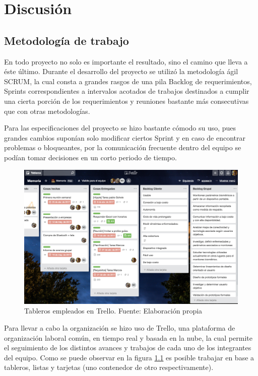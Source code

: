 \chapter{Discusión}\label{discusion}

\section{Metodología de trabajo}

En todo proyecto no solo es importante el resultado, sino el camino que lleva a éste último. Durante el desarrollo del proyecto se utilizó la metodología ágil SCRUM, la cual consta a grandes rasgos de una pila Backlog de requerimientos, Sprints correspondientes a intervalos acotados de trabajos destinados a cumplir una cierta porción de los requerimientos y reuniones bastante más consecutivas que con otras metodologías. 

Para las especificaciones del proyecto se hizo bastante cómodo su uso, pues grandes cambios suponían solo modificar ciertos Sprint y en caso de encontrar problemas o bloqueantes, por la comunicación frecuente dentro del equipo se podían tomar decisiones en un corto periodo de tiempo.

\begin{figure}[H]
	\centering
	\includegraphics[scale=0.28]{figuras/discusion/trello.png}
	\caption{Tableros empleados en Trello. Fuente: Elaboración propia}
	\label{trello}
\end{figure}


Para llevar a cabo la organización se hizo uso de Trello, una plataforma de organización laboral común, en tiempo real y basada en la nube, la cual permite el seguimiento de los distintos avances y trabajos de cada uno de los integrantes del equipo. Como se puede observar en la figura \ref{trello} es posible trabajar en base a tableros, listas y tarjetas (uno contenedor de otro respectivamente).


